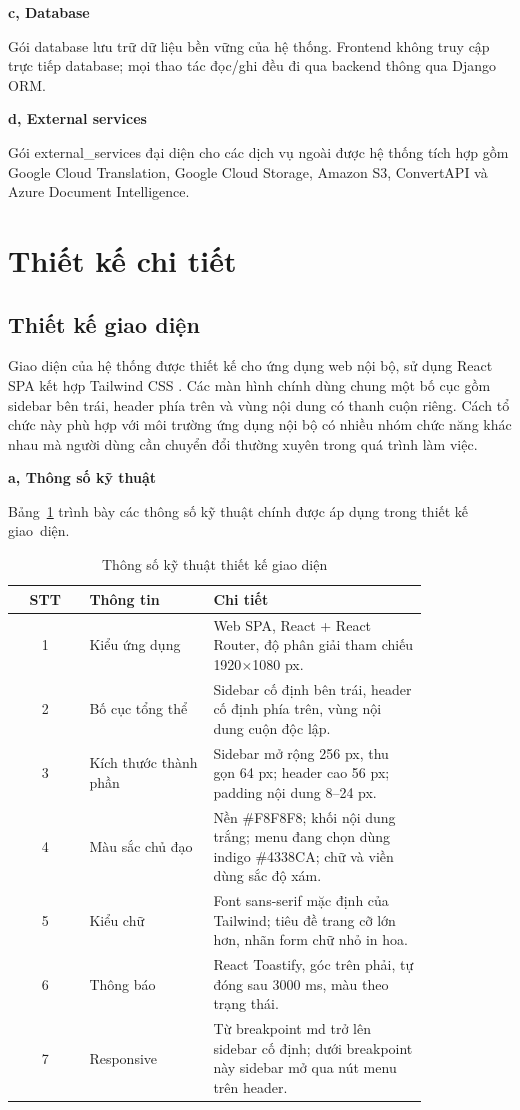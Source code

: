 ﻿\documentclass[../DoAn.tex]{subfiles}
\begin{document}
\textbf{c, Database}

Gói database lưu trữ dữ liệu bền vững của hệ thống. Frontend không truy cập trực tiếp database; mọi thao tác đọc/ghi đều đi qua backend thông qua Django ORM.

\textbf{d, External services}

Gói external\_services đại diện cho các dịch vụ ngoài được hệ thống tích hợp gồm Google Cloud Translation, Google Cloud Storage, Amazon S3, ConvertAPI và Azure Document Intelligence.

\section{Thiết kế chi tiết}
\subsection{Thiết kế giao diện}
Giao diện của hệ thống được thiết kế cho ứng dụng web nội bộ, sử dụng React SPA kết hợp Tailwind CSS \cite{tailwindcss}. Các màn hình chính dùng chung một bố cục gồm sidebar bên trái, header phía trên và vùng nội dung có thanh cuộn riêng. Cách tổ chức này phù hợp với môi trường ứng dụng nội bộ có nhiều nhóm chức năng khác nhau mà người dùng cần chuyển đổi thường xuyên trong quá trình làm việc.

\textbf{a, Thông số kỹ thuật}

Bảng~\ref{tab:ui-specification} trình bày các thông số kỹ thuật chính được áp dụng trong thiết kế giao~diện.

\begin{table}[H]
\centering
\caption{Thông số kỹ thuật thiết kế giao diện}
\label{tab:ui-specification}
\small
\renewcommand{\arraystretch}{1.2}
\begin{tabular}{|c|>{\raggedright\arraybackslash}p{0.3\linewidth}|>{\raggedright\arraybackslash}p{0.52\linewidth}|}
\hline
\textbf{STT} & \textbf{Thông tin} & \textbf{Chi tiết} \\ \hline
1 & Kiểu ứng dụng & Web SPA, React + React Router, độ phân giải tham chiếu 1920$\times$1080 px. \\ \hline
2 & Bố cục tổng thể & Sidebar cố định bên trái, header cố định phía trên, vùng nội dung cuộn độc lập. \\ \hline
3 & Kích thước thành phần & Sidebar mở rộng 256 px, thu gọn 64 px; header cao 56 px; padding nội dung 8--24 px. \\ \hline
4 & Màu sắc chủ đạo & Nền \#F8F8F8; khối nội dung trắng; menu đang chọn dùng indigo \#4338CA; chữ và viền dùng sắc độ xám. \\ \hline
5 & Kiểu chữ & Font sans-serif mặc định của Tailwind; tiêu đề trang cỡ lớn hơn, nhãn form chữ nhỏ in hoa. \\ \hline
6 & Thông báo & React Toastify, góc trên phải, tự đóng sau 3000 ms, màu theo trạng thái. \\ \hline
7 & Responsive & Từ breakpoint md trở lên sidebar cố định; dưới breakpoint này sidebar mở qua nút menu trên header. \\ \hline
\end{tabular}
\end{table}
\end{document}
